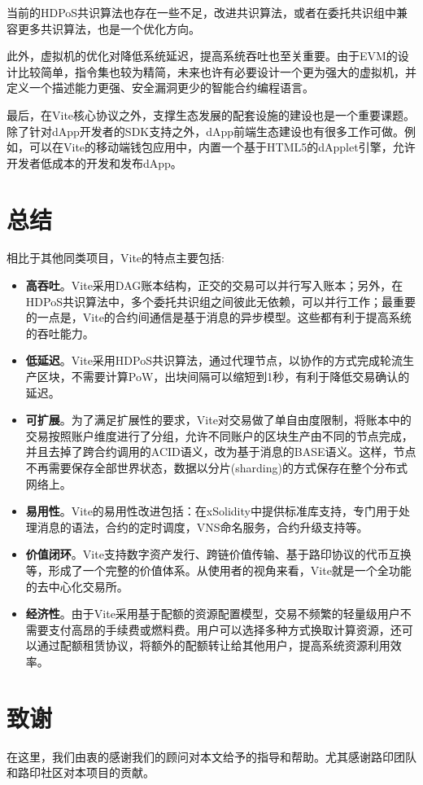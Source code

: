 \documentclass[UTF8,nofonts]{ctexart}
\begin{document}
\begin{multicols}{2}
当前的HDPoS共识算法也存在一些不足，改进共识算法，或者在委托共识组中兼容更多共识算法，也是一个优化方向。

此外，虚拟机的优化对降低系统延迟，提高系统吞吐也至关重要。由于EVM的设计比较简单，指令集也较为精简，未来也许有必要设计一个更为强大的虚拟机，并定义一个描述能力更强、安全漏洞更少的智能合约编程语言。

最后，在Vite核心协议之外，支撑生态发展的配套设施的建设也是一个重要课题。除了针对dApp开发者的SDK支持之外，dApp前端生态建设也有很多工作可做。例如，可以在Vite的移动端钱包应用中，内置一个基于HTML5的dApplet引擎，允许开发者低成本的开发和发布dApp。

\section{总结}
相比于其他同类项目，Vite的特点主要包括:

\begin{itemize}
	\item \textbf{高吞吐}。Vite采用DAG账本结构，正交的交易可以并行写入账本；另外，在HDPoS共识算法中，多个委托共识组之间彼此无依赖，可以并行工作；最重要的一点是，Vite的合约间通信是基于消息的异步模型。这些都有利于提高系统的吞吐能力。
	\item \textbf{低延迟}。Vite采用HDPoS共识算法，通过代理节点，以协作的方式完成轮流生产区块，不需要计算PoW，出块间隔可以缩短到1秒，有利于降低交易确认的延迟。
	\item \textbf{可扩展}。为了满足扩展性的要求，Vite对交易做了单自由度限制，将账本中的交易按照账户维度进行了分组，允许不同账户的区块生产由不同的节点完成，并且去掉了跨合约调用的ACID语义，改为基于消息的BASE语义。这样，节点不再需要保存全部世界状态，数据以分片(sharding)的方式保存在整个分布式网络上。
	\item \textbf{易用性}。Vite的易用性改进包括：在xSolidity中提供标准库支持，专门用于处理消息的语法，合约的定时调度，VNS命名服务，合约升级支持等。
	\item \textbf{价值闭环}。Vite支持数字资产发行、跨链价值传输、基于路印协议的代币互换等，形成了一个完整的价值体系。从使用者的视角来看，Vite就是一个全功能的去中心化交易所。
	\item \textbf{经济性}。由于Vite采用基于配额的资源配置模型，交易不频繁的轻量级用户不需要支付高昂的手续费或燃料费。用户可以选择多种方式换取计算资源，还可以通过配额租赁协议，将额外的配额转让给其他用户，提高系统资源利用效率。
\end{itemize}
\section{致谢}
在这里，我们由衷的感谢我们的顾问对本文给予的指导和帮助。尤其感谢路印团队和路印社区对本项目的贡献。

\end{multicols}
\end{document}
